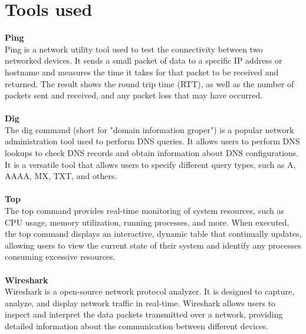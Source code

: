 \section{Tools used}
\textbf{Ping} \\
Ping is a network utility tool used to test the connectivity between two networked devices.
It sends a small packet of data to a specific IP address or hostname and measures the time it takes for that packet to be received and returned.
The result shows the round trip time (RTT), as well as the number of packets sent and received, and any packet loss that may have occurred.\\
\\
\textbf{Dig} \\
The dig command (short for "domain information groper") is a popular network administration tool used to perform DNS queries.
It allows users to perform DNS lookups to check DNS records and obtain information about DNS configurations.
It is a versatile tool that allows users to specify different query types, such as A, AAAA, MX, TXT, and others.\\
\\
\textbf{Top} \\
The top command provides real-time monitoring of system resources, such as CPU usage, memory utilization, running processes, and more.
When executed, the top command displays an interactive, dynamic table that continually updates, allowing users to view
the current state of their system and identify any processes consuming excessive resources.\\
\\
\textbf{Wireshark}\\
Wireshark is a open-source network protocol analyzer.
It is designed to capture, analyze, and display network traffic in real-time.
Wireshark allows users to inspect and interpret the data packets transmitted over a network, providing detailed information
about the communication between different devices.\\
